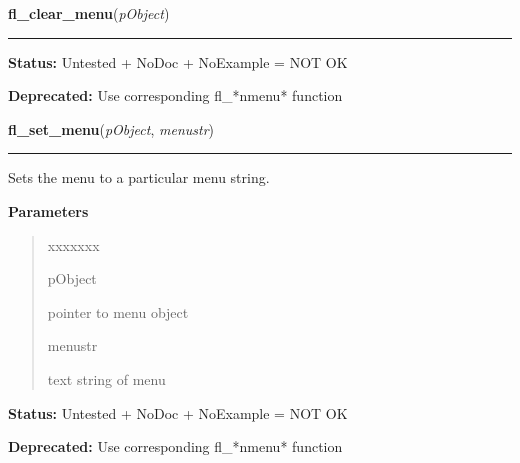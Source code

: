     \label{xformslib:library:fl_clear_menu}

    \vspace{0.5ex}

\hspace{.8\funcindent}\begin{boxedminipage}{\funcwidth}

    \raggedright \textbf{fl\_clear\_menu}(\textit{pObject})

    \vspace{-1.5ex}

    \rule{\textwidth}{0.5\fboxrule}
\setlength{\parskip}{2ex}
\setlength{\parskip}{1ex}
\textbf{Status:} Untested + NoDoc + NoExample = NOT OK



\textbf{Deprecated:} Use corresponding fl\_*nmenu* function



    \end{boxedminipage}

    \label{xformslib:library:fl_set_menu}

    \vspace{0.5ex}

\hspace{.8\funcindent}\begin{boxedminipage}{\funcwidth}

    \raggedright \textbf{fl\_set\_menu}(\textit{pObject}, \textit{menustr})

    \vspace{-1.5ex}

    \rule{\textwidth}{0.5\fboxrule}
\setlength{\parskip}{2ex}
    Sets the menu to a particular menu string.

\setlength{\parskip}{1ex}
      \textbf{Parameters}
      \vspace{-1ex}

      \begin{quote}
        \begin{Ventry}{xxxxxxx}

          \item[pObject]

          pointer to menu object

          \item[menustr]

          text string of menu

        \end{Ventry}

      \end{quote}

\textbf{Status:} Untested + NoDoc + NoExample = NOT OK



\textbf{Deprecated:} Use corresponding fl\_*nmenu* function



    \end{boxedminipage}

